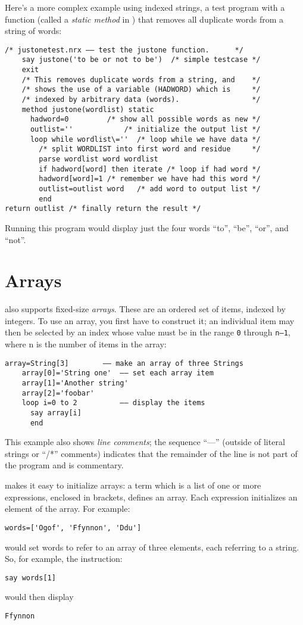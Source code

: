 Here’s a more complex example using indexed strings, a test program
with a function (called a \emph{static method} in \nr{}) that removes all
duplicate words from a string of words:
\begin{lstlisting}[label=refjust1,caption=justonetest.nrx]
    /* justonetest.nrx –– test the justone function.      */
    say justone('to be or not to be')  /* simple testcase */
    exit
    /* This removes duplicate words from a string, and    */
    /* shows the use of a variable (HADWORD) which is     */
    /* indexed by arbitrary data (words).                 */
    method justone(wordlist) static
      hadword=0         /* show all possible words as new */
      outlist=''            /* initialize the output list */
      loop while wordlist\=''  /* loop while we have data */
        /* split WORDLIST into first word and residue     */
        parse wordlist word wordlist
        if hadword[word] then iterate /* loop if had word */
        hadword[word]=1 /* remember we have had this word */
        outlist=outlist word   /* add word to output list */
        end
return outlist /* finally return the result */
\end{lstlisting}
Running this program would display just the four words “to”, “be”, “or”, and “not”.
\section{Arrays}
\nr{} also supports fixed-size \emph{arrays}. These are an ordered set of
items, indexed by integers. To use an array, you first have to
construct it; an individual item may then be selected by an index
whose value must be in the range \texttt{0} through \texttt{n–1}, where n is the number
of items in the array:
\begin{lstlisting}[label=arrays,caption=Arrays]
    array=String[3]        –– make an array of three Strings
    array[0]='String one'  –– set each array item
    array[1]='Another string'
    array[2]='foobar'
    loop i=0 to 2          –– display the items
      say array[i]
      end
\end{lstlisting}
This example also shows \nr{} \emph{line comments}; the sequence “––” (outside of literal strings or “/*” comments) indicates that the remainder of the line is not part of the program and is commentary.

\nr{} makes it easy to initialize arrays: a term which is a list of
one or more expressions, enclosed in brackets, defines an array. Each
expression initializes an element of the array. For example:
\begin{lstlisting}[label=initializingelements,caption=Initializing elements]
words=['Ogof', 'Ffynnon', 'Ddu']
\end{lstlisting}
would set words to refer to an array of three elements, each referring to a string. So, for
example, the instruction:
\begin{lstlisting}[label=addresselement,caption=Address Array Element]
say words[1]
\end{lstlisting}
would then display 
\begin{verbatim}
Ffynnon
\end{verbatim}

